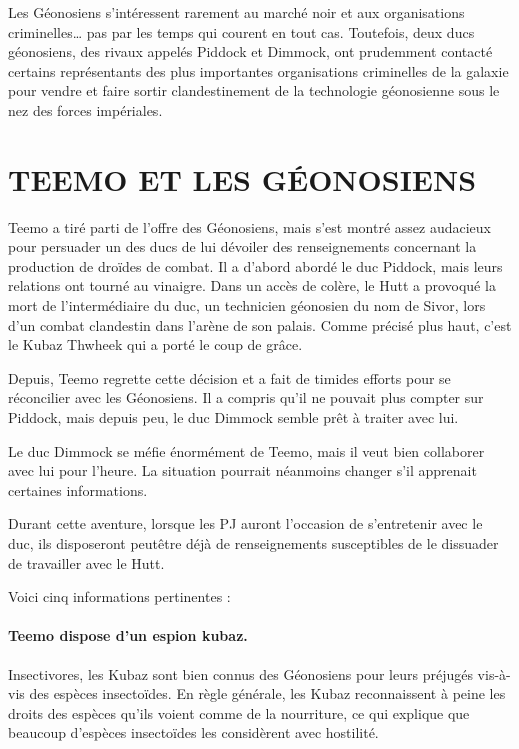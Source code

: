 \documentclass[a4paper,10pt,twoside,twocolumn,openany]{book}
\begin{document}
Les Géonosiens s’intéressent rarement au marché
noir et aux organisations criminelles… pas par les
temps qui courent en tout cas. Toutefois, deux ducs géonosiens, des rivaux appelés Piddock et Dimmock, ont
prudemment contacté certains représentants des plus
importantes organisations criminelles de la galaxie pour
vendre et faire sortir clandestinement de la technologie
géonosienne sous le nez des
forces impériales.

\section{TEEMO
ET LES
GÉONOSIENS}

Teemo a tiré parti de l’offre des
Géonosiens, mais s’est montré
assez audacieux pour persuader
un des ducs de lui dévoiler des renseignements concernant la production
de droïdes de combat. Il a d’abord abordé le
duc Piddock, mais leurs relations ont tourné
au vinaigre. Dans un accès de colère, le Hutt
a provoqué la mort de l’intermédiaire du
duc, un technicien géonosien du nom de
Sivor, lors d’un combat clandestin dans
l’arène de son palais. Comme précisé plus
haut, c’est le Kubaz Thwheek qui a porté le
coup de grâce.

Depuis, Teemo regrette cette décision et a
fait de timides efforts pour se réconcilier avec
les Géonosiens. Il a compris qu’il ne pouvait
plus compter sur Piddock, mais depuis peu, le
duc Dimmock semble prêt à traiter avec lui.

\subtitle{GAGNER LA CONFIANCE DU
DUC DIMMOCK}

Le duc Dimmock se méfie énormément de
Teemo, mais il veut bien collaborer avec lui
pour l’heure. La situation pourrait néanmoins changer s’il
apprenait certaines informations.

Durant cette aventure, lorsque les PJ auront l’occasion de s’entretenir avec le duc, ils disposeront peutêtre déjà de renseignements susceptibles de le dissuader de travailler avec le Hutt.

Voici cinq informations pertinentes :

\paragraph{Teemo dispose d’un espion kubaz.} Insectivores, 
les Kubaz sont bien connus des Géonosiens pour
leurs préjugés vis-à-vis des espèces insectoïdes. En
règle générale, les Kubaz reconnaissent à peine les
droits des espèces qu’ils voient comme de la nourriture, ce qui explique que beaucoup d’espèces insectoïdes les considèrent avec hostilité.
\end{document}
